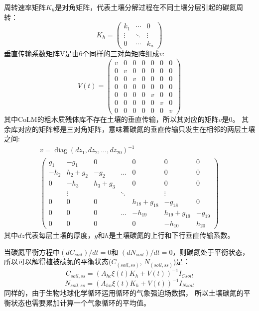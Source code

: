 周转速率矩阵$K_h$是对角矩阵，代表土壤分解过程在不同土壤分层引起的碳氮周转：
\begin{equation}
K_{h}=\left(\begin{array}{ccc}k_{1} & \cdots & 0 \\ \vdots & \ddots & \vdots \\ 0 & \cdots & k_{n}\end{array}\right)
\end{equation}
垂直传输系数矩阵V是由6个同样的三对角矩阵组成$v$:
\begin{equation}
V(t)=\left(\begin{array}{ccccccc}v & 0 & 0 & 0 & 0 & 0 & 0 \\ 0 & v & 0 & 0 & 0 & 0 & 0 \\ 0 & 0 & v & 0 & 0 & 0 & 0 \\ 0 & 0 & 0 & 0 & 0 & 0 & 0 \\ 0 & 0 & 0 & 0 & v & 0 & 0 \\ 0 & 0 & 0 & 0 & 0 & v & 0 \\ 0 & 0 & 0 & 0 & 0 & 0 & v\end{array}\right)
\end{equation}
其中CoLM的粗木质残体库不存在土壤的垂直传输，所以其对应的矩阵$v$是0。
其余库对应的矩阵都是三对角矩阵，意味着碳氮的垂直传输只发生在相邻的两层土壤之间:
\begin{equation}
\begin{array}{c}v=\operatorname{diag}\left(d z_{1}, d z_{2}, \ldots,  d z_{20}\right)^{-1} \\ 
  \left(\begin{array}{ccccccc}g_{1} & -g_{1} & 0 & & 0 & 0 & 0 \\
     -h_{2} & h_{2}+g_{2} & -g_{2} & \ldots & 0 & 0 & 0 \\ 0 & -h_{3} & h_{3}+g_{3} & & 0 & 0 & 0 \\
      & \vdots & & \ddots & & \vdots & \\ 0 & 0 & 0 & & h_{18}+g_{18} & -g_{18} & 0 \\
     0 & 0 & 0 & \ldots & -h_{19} & h_{19}+g_{19} & -g_{19} \\ 0 & 0 & 0 & & 0 & -h_{10} & h_{20}\end{array}\right)\end{array}
\end{equation}
其中$dz$代表每层土壤的厚度，$g$和$h$是土壤碳氮的上行和下行垂直传输系数。

当碳氮平衡方程中$(dC_{soil})/dt=0$和 $(dN_{soil})/dt=0$，则碳氮处于平衡状态，
所以可以解得植被碳氮的平衡状态($C_{(soil,ss)}$, $N_{(soil,ss)}$)是：
%
\begin{equation}
C_{soil, s s}=\left(A_{h c} \xi(t) K_{h}+V(t)\right)^{-1} I_{C s o i l}
\end{equation}
\begin{equation}
N_{soil, s s}=\left(A_{h n} \xi(t) K_{h}+V(t)\right)^{-1} I_{N s o i l}
\end{equation}
同样的，由于生物地球化学循环运用循环的气象强迫场数据，
所以土壤碳氮的平衡状态也需要累加计算一个气象循环的平均值。 









